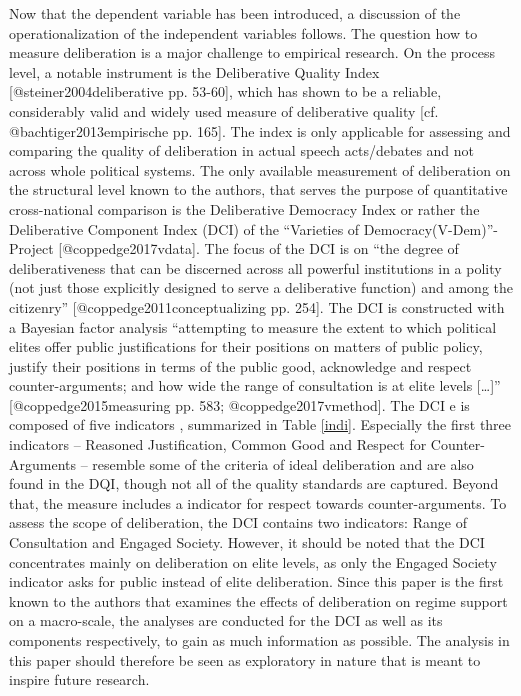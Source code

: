 \documentclass[]{article}
\begin{document}
Now that the dependent variable has been introduced, a discussion of the
operationalization of the independent variables follows. The question
how to measure deliberation is a major challenge to empirical research.
On the process level, a notable instrument is the Deliberative Quality
Index {[}@steiner2004deliberative pp. 53-60{]}, which has shown to be a
reliable, considerably valid and widely used measure of deliberative
quality {[}cf. @bachtiger2013empirische pp. 165{]}. The index is only
applicable for assessing and comparing the quality of deliberation in
actual speech acts/debates and not across whole political systems. The
only available measurement of deliberation on the structural level known
to the authors, that serves the purpose of quantitative cross-national
comparison is the Deliberative Democracy Index or rather the
Deliberative Component Index (DCI) of the ``Varieties of
Democracy(V-Dem)''-Project {[}@coppedge2017vdata{]}. The focus of the
DCI is on ``the degree of deliberativeness that can be discerned across
all powerful institutions in a polity (not just those explicitly
designed to serve a deliberative function) and among the citizenry''
{[}@coppedge2011conceptualizing pp. 254{]}. The DCI is constructed with
a Bayesian factor analysis ``attempting to measure the extent to which
political elites offer public justifications for their positions on
matters of public policy, justify their positions in terms of the public
good, acknowledge and respect counter-arguments; and how wide the range
of consultation is at elite levels {[}\ldots{}{]}''
{[}@coppedge2015measuring pp. 583; @coppedge2017vmethod{]}. The DCI e is
composed of five indicators , summarized in Table \ref{indi}. Especially
the first three indicators -- Reasoned Justification, Common Good and
Respect for Counter-Arguments -- resemble some of the criteria of ideal
deliberation and are also found in the DQI, though not all of the
quality standards are captured. Beyond that, the measure includes a
indicator for respect towards counter-arguments. To assess the scope of
deliberation, the DCI contains two indicators: Range of Consultation and
Engaged Society. However, it should be noted that the DCI concentrates
mainly on deliberation on elite levels, as only the Engaged Society
indicator asks for public instead of elite deliberation. Since this
paper is the first known to the authors that examines the effects of
deliberation on regime support on a macro-scale, the analyses are
conducted for the DCI as well as its components respectively, to gain as
much information as possible. The analysis in this paper should
therefore be seen as exploratory in nature that is meant to inspire
future research.
\end{document}
